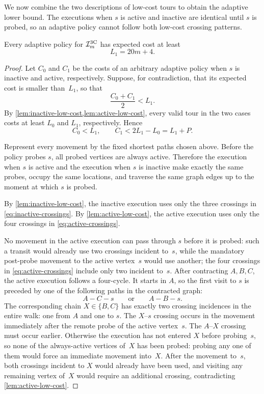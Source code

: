\documentclass[12pt,a4paper,oneside]{report}
\begin{document}
We now combine the two descriptions of low-cost tours to obtain the adaptive
lower bound.  The executions when $s$ is active and inactive are identical
until $s$ is probed, so an adaptive policy cannot follow both low-cost
crossing patterns.

\begin{lemma}\label{lem:adaptive-lower-bound}
Every adaptive policy for $\mathcal{I}_{m}^{\mathrm{3C}}$ has expected cost at
least
\[
  L_1=20m+4.
\]
\end{lemma}

\begin{proof}
Let $C_0$ and $C_1$ be the costs of an arbitrary adaptive policy when $s$ is
inactive and active, respectively.  Suppose, for contradiction, that its
expected cost is smaller than~$L_1$, so that
\[
  \frac{C_0+C_1}{2}<L_1.
\]
By \cref{lem:inactive-low-cost,lem:active-low-cost}, every valid tour in the
two cases costs at least $L_0$ and $L_1$, respectively.  Hence
\[
  C_0<L_1,
  \qquad
  C_1<2L_1-L_0=L_1+P.
\]

Represent every movement by the fixed shortest paths chosen above.  Before
the policy probes $s$, all probed vertices are always active.  Therefore the
execution when $s$ is active and the execution when $s$ is inactive make
exactly the same probes, occupy the same locations, and traverse the same
graph edges up to the moment at which $s$ is probed.

By \cref{lem:inactive-low-cost}, the inactive execution uses only the three
crossings in \cref{eq:inactive-crossings}.  By
\cref{lem:active-low-cost}, the active execution uses only the four crossings
in \cref{eq:active-crossings}.

No movement in the active execution can pass through $s$ before it is probed:
such a transit would already use two crossings incident to~$s$, while the
mandatory post-probe movement to the active vertex~$s$ would use another;
the four crossings in \cref{eq:active-crossings} include only two incident
to~$s$.  After contracting $A,B,C$, the active execution follows a four-cycle.
It starts in $A$, so the first visit to $s$ is preceded by one of the following
paths in the contracted graph:
\[
  A-C-s
  \qquad\text{or}\qquad
  A-B-s.
\]
The corresponding chain $X\in\{B,C\}$ has exactly two crossing incidences in
the entire walk: one from $A$ and one to $s$.  The $X$--$s$ crossing occurs in
the movement immediately after the remote probe of the active vertex~$s$.
The $A$--$X$ crossing must occur earlier.  Otherwise the execution has not
entered $X$ before probing~$s$, so none of the always-active vertices of~$X$
has been probed: probing any one of them would force an immediate movement
into~$X$.  After the movement to~$s$, both crossings incident to $X$ would
already have been used, and visiting any remaining vertex of~$X$ would require
an additional crossing, contradicting \cref{lem:active-low-cost}.


\end{proof}
\end{document}
